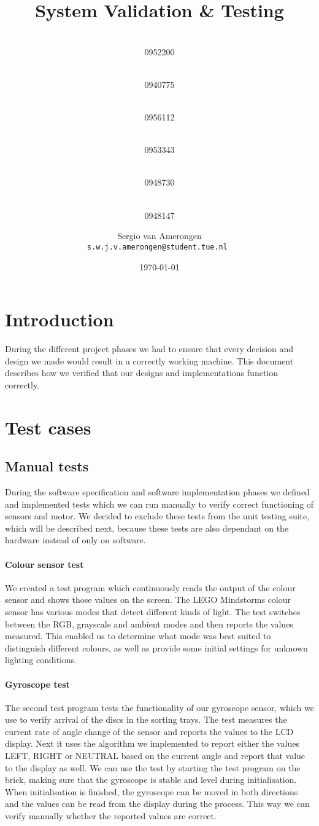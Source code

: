 \documentclass[a4paper,oneside,11pt]{article}
\title{\vspace{-\baselineskip}\sffamily\bfseries System Validation \& Testing}
\author{
	\makebox[.25\linewidth]{Sergio van Amerongen}\\0952200 \and
	\makebox[.25\linewidth]{Stefan Cloudt}\\0940775 \and
	\makebox[.25\linewidth]{Daan de Graaf}\\0956112 \and
	\makebox[.25\linewidth]{Robert van Lente}\\0953343 \and
	\makebox[.25\linewidth]{Tom Peters}\\0948730 \and
	\makebox[.25\linewidth]{Berrie Trippe}\\0948147 
	\and \makebox[.75\linewidth]{\textbf{Responsible:}} \and
	Sergio van Amerongen\\ \tt{s.w.j.v.amerongen@student.tue.nl}
}
\date{\today}
\begin{document}
\maketitle
\section{Introduction}
During the different project phases we had to ensure that every decision and design we made would result in a correctly working machine. This document describes how we verified that our designs and implementations function correctly.

\section{Test cases}
\subsection{Manual tests}
During the software specification and software implementation phases we defined and implemented tests which we can run manually to verify correct functioning of sensors and motor. We decided to exclude these tests from the unit testing suite, which will be described next, because these tests are also dependant on the hardware instead of only on software.

\paragraph{Colour sensor test} We created a test program which continuously reads the output of the colour sensor and shows those values on the screen. The LEGO Mindstorms colour sensor has various modes that detect different kinds of light. The test switches between the RGB, grayscale and ambient modes and then reports the values measured. This enabled us to determine what mode was best suited to distinguish different colours, as well as provide some initial settings for unknown lighting conditions.

\paragraph{Gyroscope test} The second test program tests the functionality of our gyroscope sensor, which we use to verify arrival of the discs in the sorting trays. The test measures the current rate of angle change of the sensor and reports the values to the LCD display. Next it uses the algorithm we implemented to report either the values LEFT, RIGHT or NEUTRAL based on the current angle and report that value to the display as well. We can use the test by starting the test program on the brick, making sure that the gyroscope is stable and level during initialisation. When initialisation is finished, the gyroscope can be moved in both directions and the values can be read from the display during the process. This way we can verify manually whether the reported values are correct. 
\end{document}
